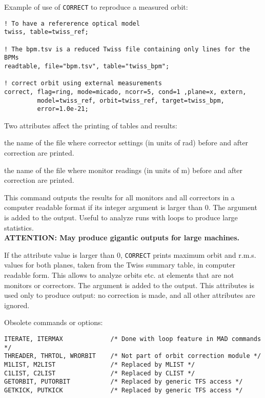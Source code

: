 Example of use of \texttt{CORRECT} to reproduce a measured orbit: 
\begin{verbatim}
! To have a refererence optical model
twiss, table=twiss_ref;

! The bpm.tsv is a reduced Twiss file containing only lines for the BPMs
readtable, file="bpm.tsv", table="twiss_bpm";

! correct orbit using external measurements
correct, flag=ring, mode=micado, ncorr=5, cond=1 ,plane=x, extern,
         model=twiss_ref, orbit=twiss_ref, target=twiss_bpm, 
         error=1.0e-21;
\end{verbatim}


Two attributes affect the printing of tables and results: 
\begin{madlist}
    the name of the file where corrector settings (in units of rad)
     before and after correction are printed.

    the name of the file where monitor readings (in units of m) before
     and after correction are printed.

    This command outputs the results for all monitors and
     all correctors in a computer readable format if its integer
     argument is larger than 0. The argument is added to the
     output. Useful to analyze runs with loops to produce large
     statistics. \\
     \textbf{ATTENTION: May produce gigantic outputs for large
       machines.} 

    If the attribute value is larger than 0, \texttt{CORRECT}
     prints maximum orbit and r.m.s. values for both planes, taken from the
     Twiss summary table, in computer readable form. This allows to analyze
     orbits etc. at elements that are not monitors or correctors. The
     argument is added to the output.  This attributes is used only to produce 
     output: no correction is made, and all other attributes are ignored.  
\end{madlist}

Obsolete commands or options:
\begin{verbatim}
ITERATE, ITERMAX             /* Done with loop feature in MAD commands */
THREADER, THRTOL, WRORBIT    /* Not part of orbit correction module */
M1LIST, M2LIST               /* Replaced by MLIST */
C1LIST, C2LIST               /* Replaced by CLIST */
GETORBIT, PUTORBIT           /* Replaced by generic TFS access */
GETKICK, PUTKICK             /* Replaced by generic TFS access */
\end{verbatim}

